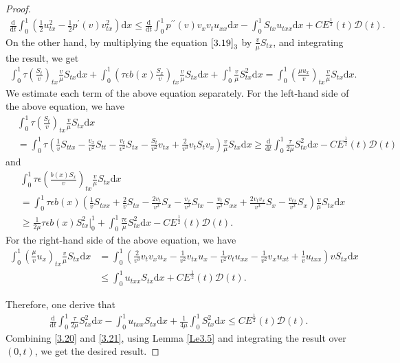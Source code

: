 \documentclass[10pt,reqno]{amsart}
\numberwithin{equation}{section}
\newcommand{\dif}{\mathrm{d}}
\begin{document}
\begin{proof}
\begin{align}
\frac{\dif}{\dif t} \int_0^1 (\frac{1}{2} u_{tx}^2-\frac{1}{2} p^\prime(v)v_{tx}^2) \dif x 
\le \frac{\dif}{\dif t} \int_0^1 p^{\prime\prime}(v) v_x v_t u_{xx}\dif x- \int_0^1 S_{tx} u_{txx}\dif x+C E^\frac{1}{2}(t) \mathcal D(t).
\end{align}
On the other hand, by multiplying the equation $\eqref{3.19}_3$ by $\frac{v}{\mu} S_{tx}$, and integrating the result, we get
\begin{align*}
\int_0^1 \tau \left(\frac{S_t}{v}\right)_{tx} \frac{v}{\mu} S_{tx} \dif x+\int_0^1\left( \tau\epsilon b(x) \frac{S_x}{v}\right)_{tx} \frac{v}{\mu} S_{tx}\dif x+\int_0^1 \frac{v}{\mu} S_{tx}^2 \dif x 
=\int_0^1 \left(\frac{\mu u_x}{v}\right)_{tx} \frac{v}{\mu} S_{tx} \dif x.
\end{align*}
We estimate each term of the above equation separately.  For the left-hand side of the above equation, we have
\begin{align*}
&\int_0^1 \tau \left(\frac{S_t}{v}\right)_{tx} \frac{v}{\mu} S_{tx} \dif x\\
&=\int_0^1 \tau \left( \frac{1}{v} S_{ttx}-\frac{v_x}{v^2}  S_{tt}-\frac{v_t}{v^2}S_{tx}-\frac{S_t}{v^2}v_{tx}+\frac{2}{v^3}v_t S_t v_x\right) \frac{v}{\mu} S_{tx} \dif x \ge \frac{\dif}{\dif t} \int_0^1 \frac{\tau}{2\mu}  S_{tx}^2 \dif x-C E^\frac{1}{2}(t) \mathcal D(t)
\end{align*}
and
\begin{align*}
&\int_0^1 \tau \epsilon  \left(\frac{b(x)S_x}{v}\right)_{tx} \frac{v}{\mu} S_{tx}\dif x\\
&=\int_0^1 \tau \epsilon b(x) \left( \frac{1}{v} S_{txx}+\frac{2}{v}S_{tx}-\frac{2v_t}{v^2}S_x-\frac{v_x}{v^2}  S_{tx}-\frac{v_t}{v^2}S_{xx}+\frac{2v_tv_x}{v^3} S_x-\frac{v_{tx}}{v^2} S_x\right) \frac{v}{\mu} S_{tx} \dif x \\
&\ge \frac{1}{2\mu} \tau \epsilon b(x) S_{tx}^2\big|_0^1+\int_0^1 \frac{\tau \epsilon}{\mu} S_{tx}^2 \dif x-C E^\frac{1}{2}(t) \mathcal D(t).
\end{align*}
For the right-hand side of the above equation, we have
\begin{align*}
\int_0^1 \left(\frac{\mu}{v} u_x\right)_{tx} \frac{v}{\mu} S_{tx}\dif x
&=\int_0^1 \left(\frac{2}{v^3} v_t v_x u_x-\frac{1}{v^2} v_{tx}u_x- \frac{1}{v^2} v_t u_{xx}-\frac{1}{v^2}v_x u_{xt}+\frac{1}{v} u_{txx}\right) v S_{tx} \dif x\\
&\le \int_0^1 u_{txx} S_{tx} \dif x +C E^\frac{1}{2}(t) \mathcal D(t).
\end{align*}

Therefore, one derive that
\begin{align}
\frac{\dif}{\dif t} \int_0^1 \frac{\tau}{2\mu} S_{tx}^2 \dif x-\int_0^1 u_{txx}S_{tx}\dif x+\frac{1}{4\mu} \int_0^1 S_{tx}^2\dif x \le C E^\frac{1}{2}(t) \mathcal D(t). \label{3.21}
\end{align}
Combining \eqref{3.20} and \eqref{3.21}, using Lemma \ref{Le3.5} and integrating the result over $(0, t)$, we get the desired result.

\end{proof}
\end{document}
